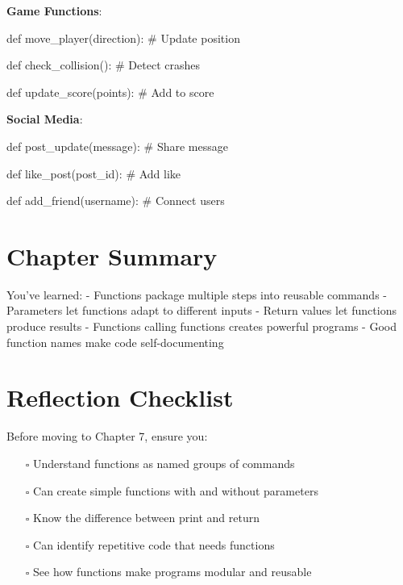 \documentclass[
  letterpaper,
  DIV=11,
  numbers=noendperiod,
  oneside]{scrreprt}
\newenvironment{Shaded}{}{}
\newcommand{\CommentTok}[1]{\textcolor[rgb]{0.42,0.45,0.49}{#1}}
\newcommand{\KeywordTok}[1]{\textcolor[rgb]{0.84,0.23,0.29}{#1}}
\newcommand{\NormalTok}[1]{\textcolor[rgb]{0.14,0.16,0.18}{#1}}
\providecommand{\tightlist}{%
  \setlength{\itemsep}{0pt}\setlength{\parskip}{0pt}}\usepackage{longtable,booktabs,array}
\begin{document}
\textbf{Game Functions}:

\begin{Shaded}
\begin{Highlighting}[]
\KeywordTok{def}\NormalTok{ move\_player(direction):}
    \CommentTok{\# Update position}

\KeywordTok{def}\NormalTok{ check\_collision():}
    \CommentTok{\# Detect crashes}

\KeywordTok{def}\NormalTok{ update\_score(points):}
    \CommentTok{\# Add to score}
\end{Highlighting}
\end{Shaded}

\textbf{Social Media}:

\begin{Shaded}
\begin{Highlighting}[]
\KeywordTok{def}\NormalTok{ post\_update(message):}
    \CommentTok{\# Share message}

\KeywordTok{def}\NormalTok{ like\_post(post\_id):}
    \CommentTok{\# Add like}

\KeywordTok{def}\NormalTok{ add\_friend(username):}
    \CommentTok{\# Connect users}
\end{Highlighting}
\end{Shaded}

\section{Chapter Summary}\label{chapter-summary-6}

You've learned: - Functions package multiple steps into reusable
commands - Parameters let functions adapt to different inputs - Return
values let functions produce results - Functions calling functions
creates powerful programs - Good function names make code
self-documenting

\section{Reflection Checklist}\label{reflection-checklist-5}

Before moving to Chapter 7, ensure you:

\begin{itemize}
\tightlist
\item[$\square$]
  Understand functions as named groups of commands
\item[$\square$]
  Can create simple functions with and without parameters
\item[$\square$]
  Know the difference between print and return
\item[$\square$]
  Can identify repetitive code that needs functions
\item[$\square$]
  See how functions make programs modular and reusable
\end{itemize}
\end{document}
